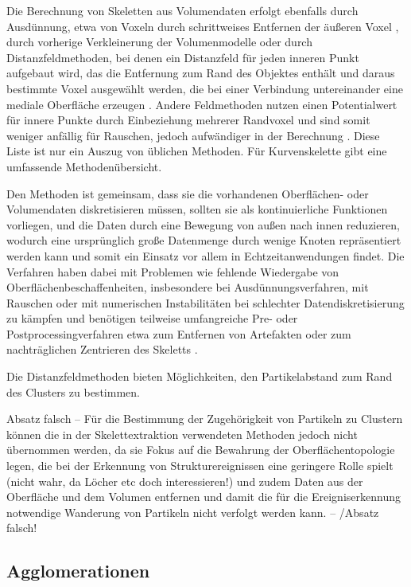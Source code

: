 Die Berechnung von Skeletten aus Volumendaten erfolgt ebenfalls durch Ausdünnung, etwa von Voxeln durch schrittweises Entfernen der äußeren Voxel \cite{ma2002TopologyPreservingReduction}, durch vorherige Verkleinerung der Volumenmodelle \cite{wang2008curveSkeletonExtraction} oder durch Distanzfeldmethoden, bei denen ein Distanzfeld für jeden inneren Punkt aufgebaut wird, das die Entfernung zum Rand des Objektes enthält und daraus bestimmte Voxel ausgewählt werden, die bei einer Verbindung untereinander eine mediale Oberfläche erzeugen \cite{hassouna2005robustCenterlineExtraction}. Andere Feldmethoden nutzen einen Potentialwert für innere Punkte durch Einbeziehung mehrerer Randvoxel und sind somit weniger anfällig für Rauschen, jedoch aufwändiger in der Berechnung \cite{cornea2005hierarchicalCurveSkeletons}. Diese Liste ist nur ein Auszug von üblichen Methoden. Für Kurvenskelette gibt \cite{cornea2007curveSkeletonProperties} eine umfassende Methodenübersicht.

Den Methoden ist gemeinsam, dass sie die vorhandenen Oberflächen- oder Volumendaten diskretisieren müssen, sollten sie als kontinuierliche Funktionen vorliegen, und die Daten durch eine Bewegung von außen nach innen reduzieren, wodurch eine ursprünglich große Datenmenge durch wenige Knoten repräsentiert werden kann und somit ein Einsatz vor allem in Echtzeitanwendungen findet. Die Verfahren haben dabei mit Problemen wie fehlende Wiedergabe von Oberflächenbeschaffenheiten, insbesondere bei Ausdünnungsverfahren, mit Rauschen oder mit numerischen Instabilitäten bei schlechter Datendiskretisierung zu kämpfen und benötigen teilweise umfangreiche Pre- oder Postprocessingverfahren etwa zum Entfernen von Artefakten oder zum nachträglichen Zentrieren des Skeletts \cite{cornea2007curveSkeletonProperties}.

Die Distanzfeldmethoden bieten Möglichkeiten, den Partikelabstand zum Rand des Clusters zu bestimmen.

Absatz falsch --
Für die Bestimmung der Zugehörigkeit von Partikeln zu Clustern können die in der Skelettextraktion verwendeten Methoden jedoch nicht übernommen werden, da sie Fokus auf die Bewahrung der Oberflächentopologie legen, die bei der Erkennung von Strukturereignissen eine geringere Rolle spielt (nicht wahr, da Löcher etc doch interessieren!) und zudem Daten aus der Oberfläche und dem Volumen entfernen und damit die für die Ereigniserkennung notwendige Wanderung von Partikeln nicht verfolgt werden kann.
-- /Absatz falsch!

\subsection{Agglomerationen}

